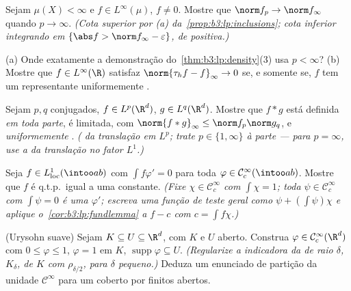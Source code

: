 \begin{exercise}[$\star\star$]\label{exo:b3:lp:4}
Sejam $\mu(X) < \infty$ e $f \in L^\infty(\mu)$, $f \neq 0$. Mostre que $\norm f_p \to \norm f_\infty$ quando $p \to \infty$. \emph{(Cota
superior por (a) da~\cref{prop:b3:lp:inclusions}; cota inferior integrando em $\{\abs f > \norm f_\infty -
\varepsilon\}$,
de  positiva.)}
\end{exercise}

\begin{exercise}[$\star\star$]\label{exo:b3:lp:5}
(a) Onde exatamente a demonstração do~\cref{thm:b3:lp:density}(3) usa $p < \infty$?
(b) Mostre que $f \in L^\infty(\R)$ satisfaz $\norm{\tau_hf -
f}_\infty \to 0$ se, e somente se, $f$ tem um
representante uniformemente .
\end{exercise}

\begin{exercise}[$\star\star$]\label{exo:b3:lp:6}
Sejam $p, q$ conjugados, $f \in L^p(\R^d)$, $g \in
L^q(\R^d)$. Mostre que $f * g$ está
definida \emph{em toda parte}, é limitada, com $\norm{f*g}_\infty \leq \norm f_p\norm g_q$, e
\emph{uniformemente }. \emph{( da translação em
$L^p$; trate $p \in \{1, \infty\}$ à parte --- para $p =
\infty$, use a  da
translação no fator $L^1$.)}
\end{exercise}

\begin{exercise}[$\star\star$]\label{exo:b3:lp:7}
Seja $f \in L^1_{\mathrm{loc}}(\intoo ab)$ com $\int f\varphi' = 0$ para toda $\varphi \in \mathcal
C^\infty_c(\intoo ab)$. Mostre que $f$ é q.t.p.\ igual
a uma constante. \emph{(Fixe $\chi \in \mathcal C_c^\infty$ com $\int\chi = 1$; toda $\psi \in \mathcal C_c^\infty$ com $\int\psi = 0$ é uma
$\varphi'$; escreva uma função de teste geral como $\psi + (\int\psi)\chi$ e aplique
o~\cref{cor:b3:lp:fundlemma} a $f - c$ com $c = \int
f\chi$.)}
\end{exercise}

\begin{exercise}[$\star\star\star$]\label{exo:b3:lp:8}
(Urysohn suave) Sejam $K \subseteq U \subseteq \R^d$, com $K$  e $U$ aberto.
Construa $\varphi \in \mathcal
C^\infty_c(\R^d)$ com $0 \leq \varphi \leq 1$, $\varphi = 1$ em $K$, $\operatorname{supp}\varphi \subseteq U$. \emph{(Regularize a
indicadora da  de raio $\delta$, $K_\delta$, de $K$ com
$\rho_{\delta/2}$, para $\delta$ pequeno.)} Deduza um enunciado de partição da
unidade $\mathcal C^\infty$ para um  coberto por finitos abertos.
\end{exercise}

